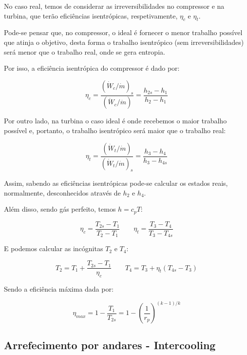No caso real, temos de considerar as irreversibilidades no compressor e na turbina, que terão eficiências isentrópicas, respetivamente, $\eta_c$ e $\eta_t$.

Pode-se pensar que, no compressor, o ideal é fornecer o menor trabalho possível que atinja o objetivo, desta forma o trabalho isentrópico (sem irreversibilidades) será menor que o trabalho real, onde se gera entropia.

Por isso, a eficiência isentrópica do compressor é dado por:

\begin{equation}
    \eta_c = \frac{(\dot{W}_c/\dot{m})_s}{(\dot{W}_c/\dot{m})} = \frac{h_{2s} - h_1}{h_{2} - h_1}
\end{equation}

Por outro lado, na turbina o caso ideal é onde recebemos o maior trabalho possível e, portanto, o trabalho isentrópico será maior que o trabalho real:

\begin{equation}
    \eta_t = \frac{(\dot{W}_t/\dot{m})}{(\dot{W}_t/\dot{m})_s} = \frac{h_3 - h_4}{h_3 - h_{4s}}
\end{equation}

Assim, sabendo as eficiências isentrópicas pode-se calcular os estados reais, normalmente, desconhecidos através de $h_2$ e $h_4$.

Além disso, sendo gás perfeito, temos $h= c_p T$:

\begin{equation}
    \eta_c = \frac{T_{2s} - T_1}{T_{2} - T_1} \qquad \eta_t = \frac{T_3 - T_4}{T_3 - T_{4s}}
\end{equation}

E podemos calcular as incógnitas $T_2$ e $T_4$:

\begin{equation}
    T_2 = T_1 + \frac{T_{2s} - T_1}{\eta_c} \qquad T_4 = T_3 + \eta_t (T_{4s} - T_3) 
\end{equation}

Sendo a eficiência máxima dada por:

\begin{equation}
    \eta_{max} = 1 - \frac{T_1}{T_{2s}} = 1 - \left(\frac{1}{r_p}\right)^{(k-1)/k}
\end{equation}

\subsection{Arrefecimento por andares - Intercooling}

